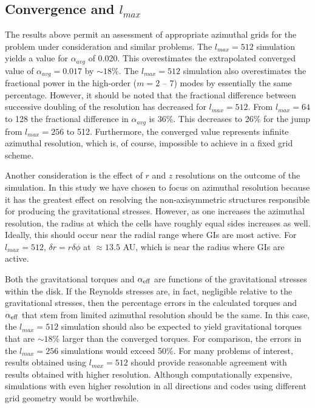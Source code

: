 \documentclass[manuscript]{aastex}
\begin{document}
\subsection{Convergence and $l_{max}$}

The results above permit an assessment of appropriate azimuthal grids for the
problem under consideration and similar problems. The $l_{max} = 512$ simulation yields a value 
for $\alpha_{avg}$ of 0.020. This overestimates the extrapolated converged value of $\alpha_{avg}
= 0.017$ by $\sim 18$\%. The $l_{max} = 512$ simulation also overestimates the fractional
power in the high-order ($m = 2$ -- 7) modes by essentially the same percentage. However, it should be noted that the fractional difference between successive doubling of the resolution has decreased for $l_{max} = 512$. From $l_{max} =64$ to 128 the fractional difference in $\alpha_{avg}$ is 36\%. This decreases to 26\% for the jump from $l_{max} = 256$ to 512. Furthermore, the converged value represents infinite azimuthal resolution, which is, of course, impossible to achieve in a fixed grid scheme. 

Another consideration is the effect of $r$ and $z$ resolutions on the outcome of the simulation. In this study we have chosen to focus on azimuthal resolution because it has the greatest effect on resolving the non-axisymmetric
structures responsible for producing the gravitational stresses. However, as one increases the azimuthal resolution, the radius at which the cells have roughly equal sides increases as well. Ideally, this should occur near the radial range where GIs are most active. For $l_{max} = 512$, $\delta r = r \delta \phi $ at $\approx 13.5$ AU, which is near the radius where GIs are active.

Both the gravitational torques and $\alpha_{\rm{eff}}$ are functions of the
gravitational stresses within the disk.  If the Reynolds stresses are, in fact, negligible relative to the gravitational stresses,
then the percentage errors in the calculated torques and $\alpha_{\rm{eff}}$ that stem from limited azimuthal resolution 
should be the same. In this case, the  $l_{max} = 512$ simulation should also be expected to yield
gravitational torques that are $\sim 18$\% larger than the converged torques.  For comparison, the
errors in the $l_{max} = 256$ simulations would exceed 50\%. For many problems of interest,
results obtained using $l_{max} = 512$ should provide reasonable agreement with results obtained 
with higher resolution. 
Although computationally expensive, simulations with even higher resolution in all directions and codes using different grid geometry
would be worthwhile.
\end{document}
